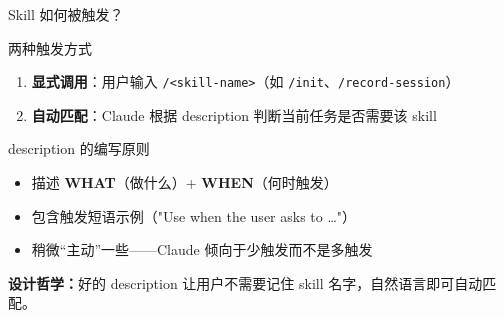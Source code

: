 \documentclass[aspectratio=169]{ctexbeamer}
\begin{document}
\begin{frame}{Skill 如何被触发？}
\large

\begin{block}{两种触发方式}
\begin{enumerate}
  \setlength\itemsep{4pt}
  \item \textbf{显式调用}：用户输入 \texttt{/<skill-name>}（如 \texttt{/init}、\texttt{/record-session}）
  \item \textbf{自动匹配}：Claude 根据 description 判断当前任务是否需要该 skill
\end{enumerate}
\end{block}

\vspace{0.2cm}

\begin{block}{description 的编写原则}
\begin{itemize}
  \setlength\itemsep{3pt}
  \item 描述 \textbf{WHAT}（做什么）+ \textbf{WHEN}（何时触发）
  \item 包含触发短语示例（"Use when the user asks to \dots"）
  \item 稍微“主动”一些——Claude 倾向于少触发而不是多触发
\end{itemize}
\end{block}

\vspace{0.2cm}

\normalsize
\textbf{设计哲学：}好的 description 让用户不需要记住 skill 名字，自然语言即可自动匹配。
\end{frame}
\end{document}
